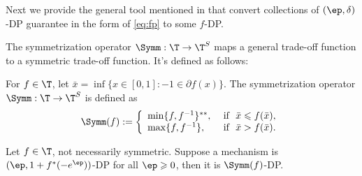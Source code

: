 


Next we provide the general tool mentioned in  that convert collections of $(\ep,\delta)$-DP guarantee in the form of \eqref{eq:fp} to some $f$-DP.

The symmetrization operator $\Symm:\T\to\T^S$ maps a general trade-off function to a symmetric trade-off function.  It's defined as follows:
\begin{definition} \label{def:symm}
	For $f\in\T$, let $\bar{x} = \inf\{x\in[0,1]:-1\in\partial f(x)\}$. The symmetrization operator $\Symm:\T\to\T^S$ is defined as
	\[\Symm(f):= \left\{
	\begin{array}{ll}
	\min\{f,f^{-1}\}^{**}, &\text{ if }\,\, \bar{x}\leqslant f(\bar{x}),\\
	\max\{f,f^{-1}\}, &\text{ if }\,\, \bar{x}>f(\bar{x}).
	\end{array}
	\right.\]
\end{definition}

\begin{proposition}\label{prop:asymm_env}
	Let $f\in\T$, not necessarily symmetric. Suppose a mechanism is $(\ep,1+f^*(-e^{\ep}))$-DP for all $\ep\geqslant 0$, then it is $\Symm(f)$-DP.
\end{proposition}


